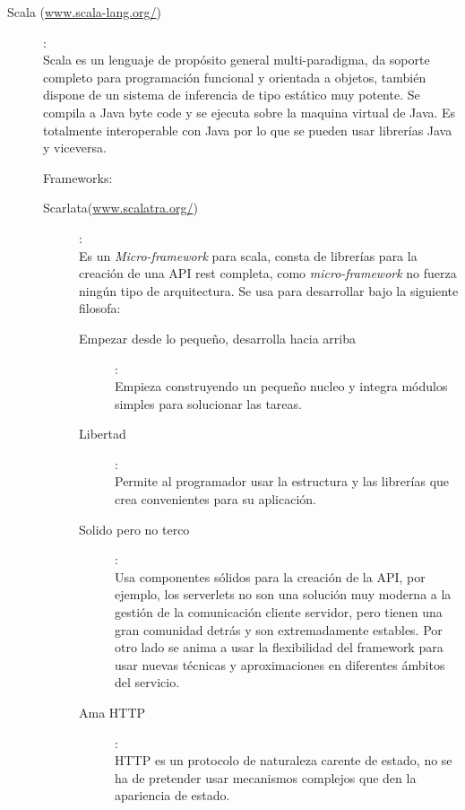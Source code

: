 \documentclass[12pt]{article} %
\begin{document}
\begin{description}
\item[Scala (\url{www.scala-lang.org/})]:
\\Scala es un lenguaje de propósito general multi-paradigma, da soporte completo para programación funcional y orientada a objetos, también dispone de un sistema de inferencia de tipo estático muy potente. Se compila a Java byte code y se ejecuta sobre la maquina virtual de Java. Es totalmente interoperable con Java por lo que se pueden usar librerías Java y viceversa.

Frameworks:
\begin{description}
\item[Scarlata(\url{www.scalatra.org/})]:
\\Es un \textit{Micro-framework} para scala, consta de librerías para la creación de una API rest completa, como \textit{micro-framework} no fuerza ningún tipo de arquitectura. Se usa para desarrollar bajo la siguiente filosofa:
\begin{description}
\item[Empezar desde lo pequeño, desarrolla hacia arriba]: \\Empieza construyendo un pequeño nucleo y integra módulos simples para solucionar las tareas.
\item[Libertad]: \\Permite al programador usar la estructura y las librerías que crea convenientes para su aplicación.
\item[Solido pero no terco]: \\Usa componentes sólidos para la creación de la API, por ejemplo, los serverlets no son una solución muy moderna a la gestión de la comunicación cliente servidor, pero tienen una gran comunidad detrás y son extremadamente estables. Por otro lado se anima a usar la flexibilidad del framework para usar nuevas técnicas y aproximaciones en diferentes ámbitos del servicio. 
\item[Ama HTTP]: \\HTTP es un protocolo de naturaleza carente de estado, no se ha de pretender usar mecanismos complejos que den la apariencia de estado.
\end{description}


\end{description}
\end{description}
\end{document}
